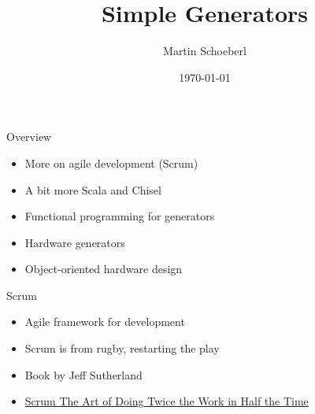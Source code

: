 

\newif\ifbook


\usepackage{tikz}
\usetikzlibrary{positioning, arrows.meta}


\title{Simple Generators}
\author{Martin Schoeberl}
\date{\today}



\begin{frame}
\titlepage
\end{frame}

\begin{frame}[fragile]{Overview}
\begin{itemize}
\item More on agile development (Scrum)
\item A bit more Scala and Chisel
\item Functional programming for generators
\item Hardware generators
\item Object-oriented hardware design
\end{itemize}
\end{frame}


\begin{frame}[fragile]{Scrum}
\begin{itemize}
\item Agile framework for development
\item Scrum is from rugby, restarting the play
\item Book  by Jeff Sutherland
\item \href{https://www.google.dk/books/edition/Scrum/RoPZCwAAQBAJ?hl=en}{Scrum
The Art of Doing Twice the Work in Half the Time}
\end{itemize}
\end{frame}


